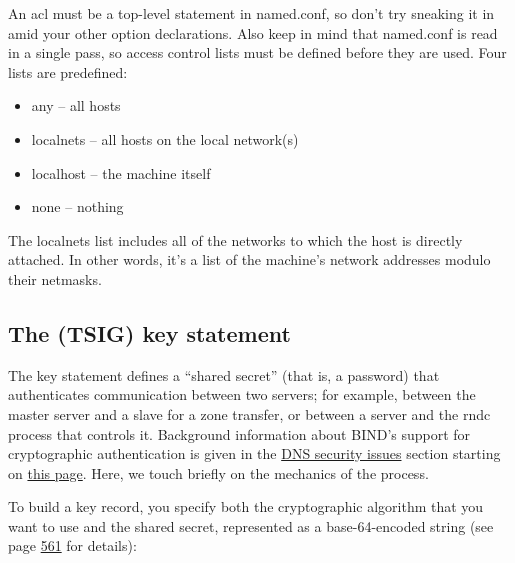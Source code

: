 An {acl} must be a top-level statement in {named.conf}, so don't try
sneaking it in amid your other option declarations. Also keep in mind
that {named.conf} is read in a single pass, so access control lists must
be defined before they are used. Four lists are predefined:

\begin{itemize}
\tightlist
\item
  {any} -- all hosts
\item
  {localnets }-- all hosts on the local network(s)
\item
  {localhost }-- the machine itself
\item
  {none} -- nothing
\end{itemize}

The {localnets} list includes all of the networks to which the host is
directly attached. In other words, it's a list of the machine's network
addresses modulo their netmasks.

\protect\hypertarget{part0024_split_039.html}{}{}

\hypertarget{part0024_split_039.htmlux5cux23_idContainer1069}{}
\hypertarget{part0024_split_039.htmlux5cux23calibre_pb_38}{%
\subsection[The (TSIG) {key}
statement]{\texorpdfstring{\protect\hypertarget{part0024_split_039.htmlux5cux23_idTextAnchor905}{}{}The
(TSIG) {key}
statement}{The (TSIG) key statement}}\label{part0024_split_039.htmlux5cux23calibre_pb_38}}

\protect\hypertarget{part0024_split_039.htmlux5cux23_idIndexMarker2179}{}{}The
{key} statement defines a ``shared secret'' (that is, a password) that
authenticates communication between two servers; for example, between
the master server and a slave for a zone transfer, or between a server
and the {rndc} process that controls it. Background information about
BIND's support for cryptographic authentication is given in the
\protect\hyperlink{part0024_split_053.htmlux5cux23_idTextAnchor931}{{DNS
security issues}} section starting on
\protect\hyperlink{part0024_split_053.htmlux5cux23_idTextAnchor931}{this
page}. Here, we touch briefly on the mechanics of the process.

To build a key record, you specify both the cryptographic algorithm that
you want to use and the shared secret, represented as a base-64-encoded
string (see page
\protect\hyperlink{part0024_split_057.htmlux5cux23_idTextAnchor936}{561}
for details):

